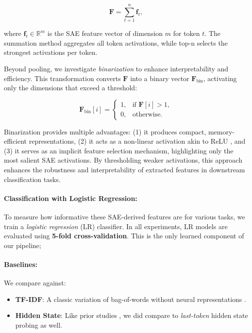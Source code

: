 \begin{equation}
    \mathbf{F} = \sum_{t=1}^n \mathbf{f}_t,
\end{equation}

where $\mathbf{f}_t \in \mathbb{R}^m$ is the SAE feature vector of dimension $m$ for token $t$. The summation method aggregates all token activations, while top-n selects the strongest activations per token.

Beyond pooling, we investigate \emph{binarization} to enhance interpretability and efficiency. This transformation converts $\mathbf{F}$ into a binary vector $\mathbf{F}_{\text{bin}}$, activating only the dimensions that exceed a threshold:

\begin{equation}
    \mathbf{F}_{\text{bin}}[i] = 
    \begin{cases}
      1, & \text{if } \mathbf{F}[i] > 1, \\
      0, & \text{otherwise}.
    \end{cases}
\end{equation}

Binarization provides multiple advantages: (1) it produces compact, memory-efficient representations, (2) it acts as a non-linear activation akin to ReLU \cite{agarap2019deeplearningusingrectified}, and (3) it serves as an implicit feature selection mechanism, highlighting only the most salient SAE activations. By thresholding weaker activations, this approach enhances the robustness and interpretability of extracted features in downstream classification tasks.


\paragraph{Classification with Logistic Regression:}
To measure how informative these SAE-derived features are for various tasks, we train a \emph{logistic regression} (LR) classifier. In all experiments, LR models are evaluated using \textbf{5-fold cross-validation}. This is the only learned component of our pipeline;
\paragraph{Baselines:} We compare against:
\begin{itemize}[itemsep=-1.7pt,topsep=1.5pt]
    \item \textbf{TF-IDF}: A classic variation of bag-of-words without neural representations \cite{sparck_jones_1972}.
    \item \textbf{Hidden State}: Like prior studies \cite{features_as_classifiers}, we did compare to \emph{last-token} hidden state probing as well. 
\end{itemize}


